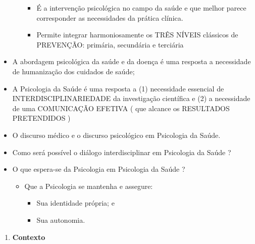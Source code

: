 \documentclass[
]{book}
\providecommand{\tightlist}{%
  \setlength{\itemsep}{0pt}\setlength{\parskip}{0pt}}
\begin{document}
\begin{itemize}
\begin{itemize}
    \begin{itemize}
    \tightlist
    \item
      É a intervenção psicológica no campo da saúde e que melhor parece corresponder as necessidades da prática clínica.
    \item
      Permite integrar harmoniosamente os TRÊS NÍVEIS clássicos de PREVENÇÃO: primária, secundária e terciária
    \end{itemize}
  \end{itemize}
\item
  A abordagem psicológica da saúde e da doença é uma resposta a necessidade de humanização dos cuidados de saúde;
\item
  A Psicologia da Saúde é uma resposta a (1) necessidade essencial de INTERDISCIPLINARIEDADE da investigação científica e (2) a necessidade de uma COMUNICAÇÃO EFETIVA ( que alcance os RESULTADOS PRETENDIDOS )
\item
  O discurso médico e o discurso psicológico em Psicologia da Saúde.
\item
  Como será possível o diálogo interdisciplinar em Psicologia da Saúde ?
\item
  O que espera-se da Psicologia em Psicologia da Saúde ?

  \begin{itemize}
  \tightlist
  \item
    Que a Psicologia se mantenha e assegure:

    \begin{itemize}
    \tightlist
    \item
      Sua identidade própria; e
    \item
      Sua autonomia.
    \end{itemize}
  \end{itemize}
\end{itemize}

\begin{enumerate}
\def\labelenumi{\arabic{enumi}.}
\setcounter{enumi}{1}
\tightlist
\item
  \textbf{Contexto}
\end{enumerate}
\end{document}
